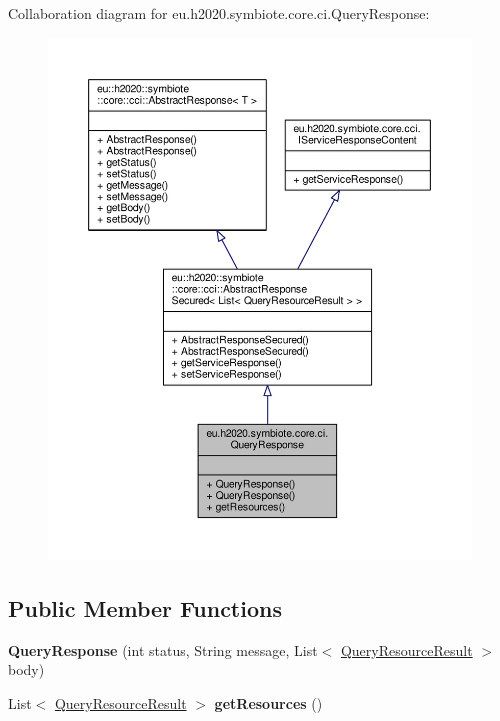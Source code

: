 Collaboration diagram for eu.\+h2020.\+symbiote.\+core.\+ci.\+Query\+Response\+:\nopagebreak
\begin{figure}[H]
\begin{center}
\leavevmode
\includegraphics[width=350pt]{classeu_1_1h2020_1_1symbiote_1_1core_1_1ci_1_1QueryResponse__coll__graph}
\end{center}
\end{figure}
\subsection*{Public Member Functions}
\begin{DoxyCompactItemize}
\item 
\mbox{\label{classeu_1_1h2020_1_1symbiote_1_1core_1_1ci_1_1QueryResponse_a1f873efb29ed2e2279c360f44e9b7d9c}} 
{\bfseries Query\+Response} (int status, String message, List$<$ \hyperlink{classeu_1_1h2020_1_1symbiote_1_1core_1_1ci_1_1QueryResourceResult}{Query\+Resource\+Result} $>$ body)
\item 
\mbox{\label{classeu_1_1h2020_1_1symbiote_1_1core_1_1ci_1_1QueryResponse_ac5c0b66275ca9f7a0f8f01d2f38b9ccc}} 
List$<$ \hyperlink{classeu_1_1h2020_1_1symbiote_1_1core_1_1ci_1_1QueryResourceResult}{Query\+Resource\+Result} $>$ {\bfseries get\+Resources} ()
\end{DoxyCompactItemize}


